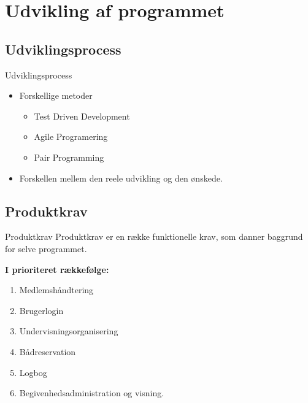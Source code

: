 \section{Udvikling af programmet}
\subsection{Udviklingsprocess}
\begin{frame}{Udviklingsprocess}
	\begin{itemize}
		\item Forskellige metoder
			\begin{itemize}
				\item Test Driven Development
				\item Agile Programering
				\item Pair Programming
			\end{itemize}
		\item Forskellen mellem den reele udvikling og den ønskede.
	\end{itemize}
\end{frame}

\subsection{Produktkrav}
\begin{frame}{Produktkrav}
Produktkrav er en række funktionelle krav, som danner baggrund for selve programmet.


\textbf{I prioriteret rækkefølge:}
\begin{enumerate}
  \item Medlemshåndtering
  \item Brugerlogin
  \item Undervisningsorganisering 
  \item Bådreservation
  \item Logbog
  \item Begivenhedsadministration og visning.
\end{enumerate}
\end{frame}


